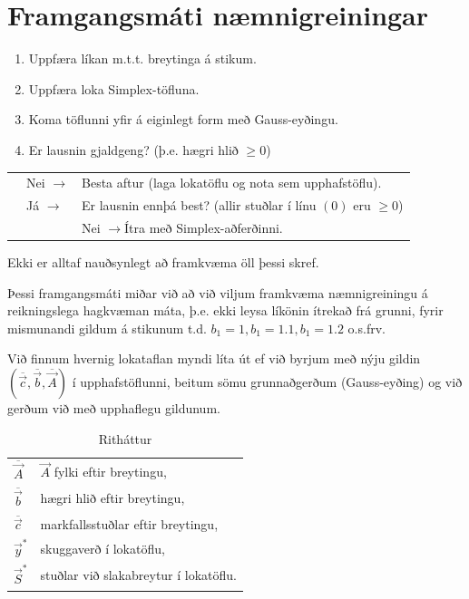 \section{Framgangsmáti næmnigreiningar}
\begin{enumerate}
 \item Uppfæra líkan m.t.t. breytinga á stikum.
 \item Uppfæra loka Simplex-töfluna.
 \item Koma töflunni yfir á eiginlegt form með Gauss-eyðingu.
 \item Er lausnin gjaldgeng? (þ.e. hægri hlið $\geq0$)
\end{enumerate}
\begin{tabular}{llp{10cm}}
\hspace{1cm} & Nei $\rightarrow$ & Besta aftur (laga lokatöflu og nota sem upphafs\-töflu).\\
& Já  $\rightarrow$ & Er lausnin ennþá best? (allir stuðlar í línu $(0)$ eru $\geq 0$)\\
& & Nei $\rightarrow$\quad Ítra með Simplex-aðferðinni.
\end{tabular}

\begin{aths}Ekki er alltaf nauðsynlegt að framkvæma öll þessi skref.\end{aths}

Þessi framgangsmáti miðar við að við viljum framkvæma næmnigreiningu á reikningslega hagkvæman máta, þ.e. ekki leysa líkönin ítrekað frá grunni, fyrir mismunandi gildum á stikunum t.d. $b_1=1,b_1=1.1,b_1=1.2$ o.s.frv.

Við finnum hvernig lokataflan myndi líta út ef við byrjum með nýju gildin $(\overline{\vec{c}},\overline{\vec{b}},\overline{\vec{A}})$ í upphafstöflunni, beitum sömu grunnaðgerðum (Gauss-eyðing) og við gerðum við með upphaflegu gildunum. 


\begin{table}[h!]
\begin{center}
{\renewcommand{\arraystretch}{1.5} \renewcommand{\tabcolsep}{0.2cm}
\begin{tabular}{|ll|}\hline 
$\overline{\vec{A}}$ & $\vec{A}$ fylki eftir breytingu,\\
$\overline{\vec{b}}$ & hægri hlið eftir breytingu,\\
$\overline{\vec{c}}$ & markfallsstuðlar eftir breytingu,\\
$\vec{y}^*$ & skuggaverð í lokatöflu,\\
$\vec{S}^*$ & stuðlar við slakabreytur í lokatöflu.\\\hline
\end{tabular}}
\caption{Ritháttur}
\end{center}
\end{table}

